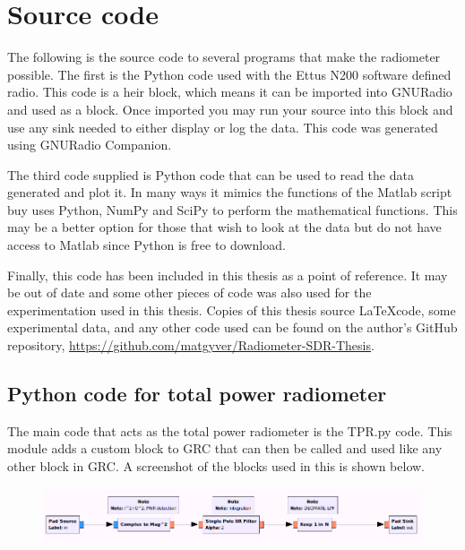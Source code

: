 \appendixtitle
\appendix
\chapter{Source code} \label{appendix1}

The following is the source code to several programs that make the radiometer possible.  The first is the Python code used with the Ettus N200 software defined radio.  This code is a heir block, which means it can be imported into GNURadio and used as a block.  Once imported you may run your source into this block and use any sink needed to either display or log the data.  This code was generated using GNURadio Companion.  


The third code supplied is Python code that can be used to read the data generated and plot it.  In many ways it mimics the functions of the Matlab script buy uses Python, NumPy and SciPy to perform the mathematical functions.  This may be a better option for those that wish to look at the data but do not have access to Matlab since Python is free to download.

Finally, this code has been included in this thesis as a point of reference.  It may be out of date and some other pieces of code was also used for the experimentation used in this thesis.  Copies of this thesis source \LaTeX code, some experimental data, and any other code used can be found on the author's GitHub repository, \url{https://github.com/matgyver/Radiometer-SDR-Thesis}.


\section*{Python code for total power radiometer}
The main code that acts as the total power radiometer is the TPR.py code.  This module adds a custom block to GRC that can then be called and used like any other block in GRC.  A screenshot of the blocks used in this is shown below.

{\begin{figure}[h!tb] 
\centering
\includegraphics[width=0.8\linewidth]{Images/TPR_grc.png}
\label{TPR_GRC}
\end{figure}

}

